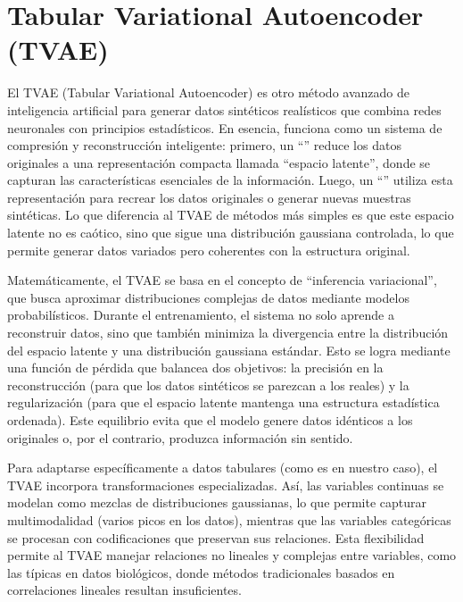 \documentclass[a4paper,10pt,spanish]{jupyterBook}
\begin{document}
\sphinxstepscope


\section{Tabular Variational Autoencoder (TVAE)}
\label{\detokenize{content/02/TVAE:tabular-variational-autoencoder-tvae}}\label{\detokenize{content/02/TVAE::doc}}
\sphinxAtStartPar
El TVAE (Tabular Variational Autoencoder) es otro método avanzado de inteligencia artificial para generar datos sintéticos realísticos que combina redes neuronales con principios estadísticos. En esencia, funciona como un sistema de compresión y reconstrucción inteligente: primero, un “” reduce los datos originales a una representación compacta llamada “espacio latente”, donde se capturan las características esenciales de la información. Luego, un “” utiliza esta representación para recrear los datos originales o generar nuevas muestras sintéticas. Lo que diferencia al TVAE de métodos más simples es que este espacio latente no es caótico, sino que sigue una distribución gaussiana controlada, lo que permite generar datos variados pero coherentes con la estructura original.

\sphinxAtStartPar
Matemáticamente, el TVAE se basa en el concepto de “inferencia variacional”, que busca aproximar distribuciones complejas de datos mediante modelos probabilísticos. Durante el entrenamiento, el sistema no solo aprende a reconstruir datos, sino que también minimiza la divergencia entre la distribución del espacio latente y una distribución gaussiana estándar. Esto se logra mediante una función de pérdida que balancea dos objetivos: la precisión en la reconstrucción (para que los datos sintéticos se parezcan a los reales) y la regularización (para que el espacio latente mantenga una estructura estadística ordenada). Este equilibrio evita que el modelo genere datos idénticos a los originales o, por el contrario, produzca información sin sentido.

\sphinxAtStartPar
Para adaptarse específicamente a datos tabulares (como es en nuestro caso), el TVAE incorpora transformaciones especializadas. Así, las variables continuas se modelan como mezclas de distribuciones gaussianas, lo que permite capturar multimodalidad (varios picos en los datos), mientras que las variables categóricas se procesan con codificaciones que preservan sus relaciones. Esta flexibilidad permite al TVAE manejar relaciones no lineales y complejas entre variables, como las típicas en datos biológicos, donde métodos tradicionales basados en correlaciones lineales resultan insuficientes.
\end{document}
